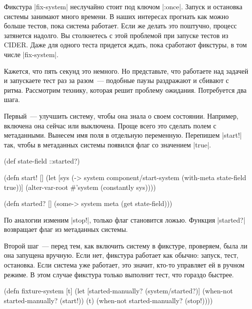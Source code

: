 Фикстура \spverb|fix-system| неслучайно стоит под ключом \spverb|:once|. Запуск
и остановка системы занимают много времени. В наших интересах прогнать как можно
больше тестов, пока система работает. Если же делать это поштучно, процесс
затянется надолго. Вы столкнетесь с этой проблемой при запуске тестов из
CIDER. Даже для одного теста придется ждать, пока сработают фикстуры, в том
числе \spverb|fix-system|.

Кажется, что пять секунд это немного. Но представьте, что работаете над задачей
и запускаете тест раз за разом~--- подобные паузы раздражают и сбивают с
ритма. Рассмотрим технику, которая решит проблему ожидания. Потребуется два
шага.

Первый~--- улучшить систему, чтобы она знала о своем состоянии. Например,
включена она сейчас или выключена. Проще всего это сделать полем с
метаданными. Вынесем имя поля в отдельную переменную. Перепишем \spverb|start!|
так, чтобы в метаданных системы появился флаг со значением \spverb|true|.

\begin{english}
  \begin{clojure}
(def state-field ::started?)

(defn start! []
  (let [sys (-> system
                component/start-system
                (with-meta {state-field true}))]
    (alter-var-root #'system (constantly sys))))

(defn started? []
  (some-> system meta (get state-field)))
  \end{clojure}
\end{english}

По аналогии изменим \spverb|stop!|, только флаг становится ложью. Функция
\spverb|started?| возвращает флаг из метаданных системы.

Второй шаг~--- перед тем, как включить систему в фикстуре, проверяем, была ли
она запущена вручную. Если нет, фикстура работает как обычно: запуск, тест,
остановка. Если система уже работает, это значит, кто-то управляет ей в ручном
режиме. В этом случае фикстура только выполнит тест, что гораздо быстрее.

\begin{english}
  \begin{clojure}
(defn fixture-system [t]
  (let [started-manually? (system/started?)]
    (when-not started-manually?
      (start!))
    (t)
    (when-not started-manually?
      (stop!))))
  \end{clojure}
\end{english}

